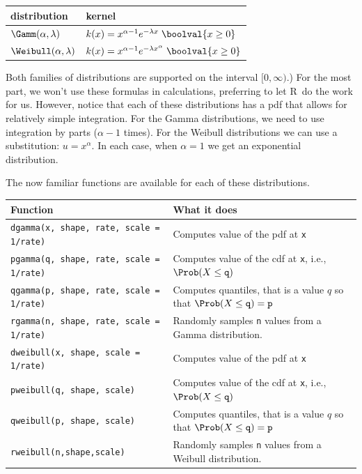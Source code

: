 \documentclass[twoside]{book}\usepackage[]{graphicx}\usepackage[]{xcolor}
\def\R{{\sf R}}
\begin{document}
\begin{center}
	\begin{tabular}{ll}
		\hline
		distribution & kernel
		\\
		\hline
		$\Gamm(\alpha, \lambda)$ & $ k(x) = x^{\alpha-1} e^{-\lambda x} \; \boolval{x \ge 0}$
		\\
		$\Weibull(\alpha, \lambda)$ & $ k(x) = x^{\alpha-1} e^{-\lambda x^{\alpha}} \; \boolval{x \ge 0}$
		\\
		\hline
	\end{tabular}
\end{center}
Both families of distributions are supported on the interval $[0, \infty)$.)
For the most part, we won't use these formulas in calculations, 
preferring to let \R\ do the work for us. However, notice that each
of these distributions has a pdf that allows for relatively simple integration.  For the 
Gamma distributions, we need to use integration by parts ($\alpha - 1$ times).  For 
the Weibull distributions we can use a substitution: $u = x^{\alpha}$.
In each case, when $\alpha = 1$ we get an exponential distribution.

The now familiar functions are available for each of these distributions.
\begin{center}
\begin{tabular}{ll}
	\hline
	Function & What it does \\
	\hline
	\texttt{dgamma(x, shape, rate, scale = 1/rate)} & Computes value of the pdf at \texttt{x}
	\\
	\texttt{pgamma(q, shape, rate, scale = 1/rate)} 
		& Computes value of the cdf at \texttt{x}, i.e., 
	$\Prob(X \le \texttt{q})$
	\\
	\texttt{qgamma(p, shape, rate, scale = 1/rate)} 
		& Computes quantiles, that is a value $q$ so that 
	$\Prob(X \le \texttt{q}) = \texttt{p}$
    \\
	\texttt{rgamma(n, shape, rate, scale = 1/rate)} & Randomly samples \texttt{n} values from a
	Gamma distribution.
	\\
	\hline
	\texttt{dweibull(x, shape, scale = 1/rate)} & Computes value of the pdf at \texttt{x}
	\\
	\texttt{pweibull(q, shape, scale)} 
		& Computes value of the cdf at \texttt{x}, i.e., 
	$\Prob(X \le \texttt{q})$
	\\
	\texttt{qweibull(p, shape, scale)} 
		& Computes quantiles, that is a value $q$ so that 
	$\Prob(X \le \texttt{q}) = \texttt{p}$
    \\
	\texttt{rweibull(n,shape,scale)} & Randomly samples \texttt{n} values from a
	Weibull distribution.
	\\
	\hline
\end{tabular}
\end{center}
\end{document}
